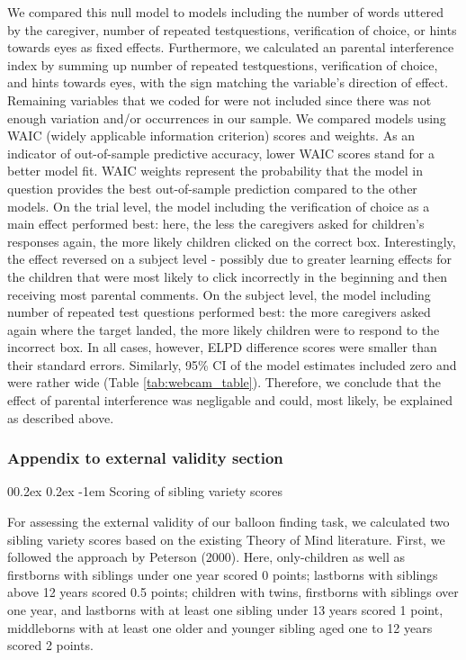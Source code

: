 \documentclass[
  man,floatsintext]{apa6}
\makeatletter
\let\oldparagraph\paragraph
\renewcommand{\paragraph}[1]{\oldparagraph{#1}\mbox{}}
\renewcommand{\paragraph}{\@startsection{paragraph}{4}{\parindent}%
  {0\baselineskip \@plus 0.2ex \@minus 0.2ex}%
  {-1em}%
  {\normalfont\normalsize\bfseries\itshape\typesectitle}}
\makeatother
\begin{document}
We compared this null model to models including the number of words uttered by the caregiver, number of repeated testquestions, verification of choice, or hints towards eyes as fixed effects. Furthermore, we calculated an parental interference index by summing up number of repeated testquestions, verification of choice, and hints towards eyes, with the sign matching the variable's direction of effect. Remaining variables that we coded for were not included since there was not enough variation and/or occurrences in our sample.
We compared models using WAIC (widely applicable information criterion) scores and weights. As an indicator of out-of-sample predictive accuracy, lower WAIC scores stand for a better model fit. WAIC weights represent the probability that the model in question provides the best out-of-sample prediction compared to the other models.
On the trial level, the model including the verification of choice as a main effect performed best: here, the less the caregivers asked for children's responses again, the more likely children clicked on the correct box. Interestingly, the effect reversed on a subject level - possibly due to greater learning effects for the children that were most likely to click incorrectly in the beginning and then receiving most parental comments. On the subject level, the model including number of repeated test questions performed best: the more caregivers asked again where the target landed, the more likely children were to respond to the incorrect box. In all cases, however, ELPD difference scores were smaller than their standard errors. Similarly, 95\% CI of the model estimates included zero and were rather wide (Table \ref{tab:webcam_table}). Therefore, we conclude that the effect of parental interference was negligable and could, most likely, be explained as described above.

\hypertarget{appendix-to-external-validity-section}{%
\subsubsection{Appendix to external validity section}\label{appendix-to-external-validity-section}}

\hypertarget{scoring-of-sibling-variety-scores}{%
\paragraph{Scoring of sibling variety scores}\label{scoring-of-sibling-variety-scores}}

For assessing the external validity of our balloon finding task, we calculated two sibling variety scores based on the existing Theory of Mind literature.
First, we followed the approach by Peterson (2000). Here, only-children as well as firstborns with siblings under one year scored 0 points; lastborns with siblings above 12 years scored 0.5 points; children with twins, firstborns with siblings over one year, and lastborns with at least one sibling under 13 years scored 1 point, middleborns with at least one older and younger sibling aged one to 12 years scored 2 points.
\end{document}
